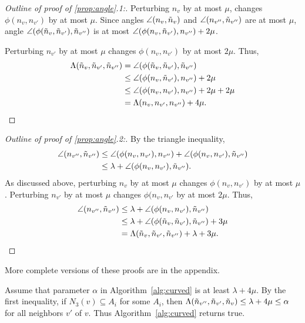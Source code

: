 \begin{proof}[Outline of proof of \ref{prop:angle}.1:]
Perturbing $n_v$ by at most $\mu$,
changes $\phi(n_v,n_{v'})$ by at most $\mu$.
Since angles $\angle(n_v,\tilde{n}_v)$ and $\angle(n_{v''},\tilde{n}_{v''})$
are at most $\mu$,
angle $\angle(\phi(\tilde{n}_v,\tilde{n}_{v'}), \tilde{n}_{v''})$ is at most
$\angle(\phi(n_v,\tilde{n}_{v'}), n_{v''})+2 \mu$.

Perturbing $n_{v'}$ by at most $\mu$
changes $\phi(n_v,n_{v'})$ by at most $2\mu$.
Thus,
\begin{align*}
\Lambda(\tilde{n}_v, \tilde{n}_{v'}, \tilde{n}_{v''}) & 
= \angle(\phi(\tilde{n}_v,\tilde{n}_{v'}), \tilde{n}_{v''}) \\
& \le \angle(\phi(n_v,\tilde{n}_{v'}), n_{v''}) + 2 \mu\\
& \le \angle(\phi(n_v,n_{v'}), n_{v''}) + 2 \mu + 2 \mu\\
& = \Lambda(n_v,n_{v'},n_{v''}) + 4 \mu.
\end{align*}
\end{proof}

\begin{proof}[Outline of proof of \ref{prop:angle}.2:]
By the triangle inequality,
\begin{align*}
\angle(n_{v''},\tilde{n}_{v''}) & \le 
\angle(\phi(n_v,n_{v'}),n_{v''}) + \angle(\phi(n_v,n_{v'}),\tilde{n}_{v''}) \\
& \le \lambda + \angle(\phi(n_v,n_{v'}),\tilde{n}_{v''}).
\end{align*}
As discussed above, perturbing $n_v$ by at most $\mu$
changes $\phi(n_v,n_{v'})$ by at most $\mu$.
Perturbing $n_{v'}$ by at most $\mu$
changes $\phi(n_v,n_{v'}$ by at most $2\mu$.
Thus,
\begin{align*}
\angle(n_{v''},\tilde{n}_{v''}) 
& \le \lambda + \angle(\phi(n_v,n_{v'}),\tilde{n}_{v''}) \\
& \le \lambda + \angle(\phi(\tilde{n}_v, \tilde{n}_{v'}), \tilde{n}_{v''}) + 3\mu \\
& = \Lambda(\tilde{n}_v,\tilde{n}_{v'},\tilde{n}_{v''}) + \lambda + 3\mu.
\end{align*}
\end{proof}
More complete versions of these proofs are in the appendix.

Assume that parameter $\alpha$ in Algorithm~\ref{alg:curved} 
is at least $\lambda + 4 \mu$.
By the first inequality, 
if $N_3(v) \subseteq A_i$ for some $A_i$,
then $\Lambda(\tilde{n}_{v''}, \tilde{n}_{v'}, \tilde{n}_v) \le \lambda+4\mu \le \alpha$
for all neighbors $v'$ of $v$.
Thus Algorithm~\ref{alg:curved} returns true.

